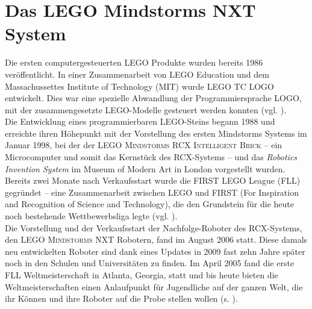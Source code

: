 \documentclass[paper=a4, DIV=14, BCOR=15mm, twoside=on, onecolumn=on, open = right, titlepage =on, parskip =half, headsepline = on, footsepline = on, chapterprefix = on, appendixprefix = off, fontsize = 12pt, numbers = noenddot, abstract = on]{scrbook}
\begin{document}
\section{Das LEGO Mindstorms NXT System}
\onehalfspacing
Die ersten computergesteuerten \textsc{LEGO} Produkte wurden bereits 1986 veröffentlicht. In einer Zusammenarbeit von \textsc{LEGO} Education und dem Massachussettes Institute of Technology (MIT) wurde \textsc{LEGO TC LOGO} entwickelt. Dies war eine spezielle Abwandlung der Programmiersprache LOGO, mit der zusammengesetzte \textsc{LEGO}-Modelle gesteuert werden konnten (vgl. \cite{rolling:14}).\\
Die Entwicklung eines programmierbaren \textsc{LEGO}-Steins begann 1988 und erreichte ihren Höhepunkt mit der Vorstellung des ersten Mindstorms Systems im Januar 1998, bei der der \textsc{LEGO Mindstorms RCX Intelligent Brick} -- ein Microcomputer und somit das Kernstück des RCX-Systems -- und das \emph{Robotics Invention System} im Museum of Modern Art in London vorgestellt wurden.\\
Bereits zwei Monate nach Verkaufsstart wurde die FIRST LEGO League (FLL) gegründet -- eine Zusammenarbeit zwischen \textsc{LEGO} und FIRST (For Inspiration and Recognition of Science and Technology), die den Grundstein für die heute noch bestehende Wettbewerbsliga legte (vgl. \cite{rolling:14}).\\
Die Vorstellung und der Verkaufsstart der Nachfolge-Roboter des RCX-Systems, den \textsc{LEGO Mindstorms} NXT Robotern, fand im August 2006 statt. Diese damals neu entwickelten Roboter sind dank eines Updates in 2009 fast zehn Jahre später noch in den Schulen und Universitäten zu finden. Im April 2005 fand die erste FLL Weltmeisterschaft in Atlanta, Georgia, statt und bis heute bieten die Weltmeisterschaften einen Anlaufpunkt für Jugendliche auf der ganzen Welt, die ihr Können und ihre Roboter auf die Probe stellen wollen (s. \cite{lego}).

\par \singlespacing
\end{document}
